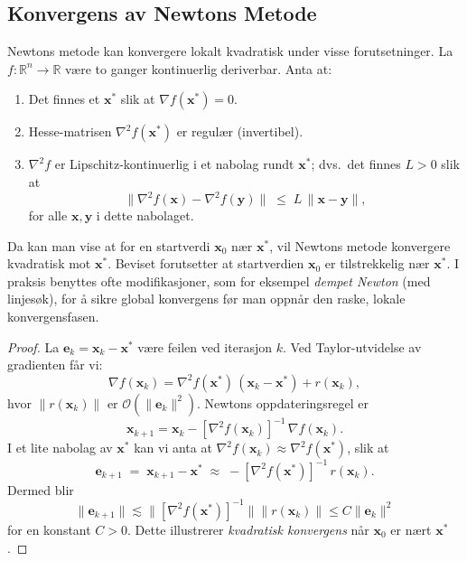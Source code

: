 \subsection{Konvergens av Newtons Metode}
Newtons metode kan konvergere lokalt kvadratisk under visse forutsetninger.
La \( f : \mathbb{R}^n \to \mathbb{R} \) være to ganger kontinuerlig deriverbar. Anta at:

\begin{enumerate}
	\item Det finnes et \(\symbf{x}^\ast\) slik at \(\nabla f(\symbf{x}^\ast) = 0\).
	\item Hesse-matrisen \(\nabla^2 f(\symbf{x}^\ast)\) er regulær (invertibel).
	\item \(\nabla^2 f\) er Lipschitz-kontinuerlig i et nabolag rundt \(\symbf{x}^\ast\); dvs.\ det finnes \( L > 0 \) slik at
	      \[
		      \| \nabla^2 f(\symbf{x}) - \nabla^2 f(\symbf{y}) \|
		      \;\le\;
		      L\,\|\symbf{x} - \symbf{y}\|,
	      \]
	      for alle \(\symbf{x}, \symbf{y}\) i dette nabolaget.
\end{enumerate}

Da kan man vise at for en startverdi \(\symbf{x}_0\) nær \(\symbf{x}^\ast\), vil Newtons metode konvergere kvadratisk mot \(\symbf{x}^\ast\).
Beviset forutsetter at startverdien \(\symbf{x}_0\) er tilstrekkelig nær \(\symbf{x}^\ast\). I praksis benyttes ofte modifikasjoner, som for eksempel \textit{dempet Newton} (med linjesøk), for å sikre global konvergens før man oppnår den raske, lokale konvergensfasen.
\begin{proof}{}{}
	La \(\symbf{e}_k = \symbf{x}_k - \symbf{x}^\ast\) være feilen ved iterasjon \(k\).
	Ved Taylor-utvidelse av gradienten får vi:
	\[
		\nabla f(\symbf{x}_k)
		= \nabla^2 f(\symbf{x}^\ast)\,(\symbf{x}_k - \symbf{x}^\ast) + r(\symbf{x}_k),
	\]
	hvor \(\|r(\symbf{x}_k)\|\) er \(\mathcal{O}(\|\symbf{e}_k\|^2)\). Newtons oppdateringsregel er
	\[
		\symbf{x}_{k+1}
		= \symbf{x}_k
		- [\nabla^2 f(\symbf{x}_k)]^{-1}\,\nabla f(\symbf{x}_k).
	\]
	I et lite nabolag av \(\symbf{x}^\ast\) kan vi anta at
	\(\nabla^2 f(\symbf{x}_k)\approx \nabla^2 f(\symbf{x}^\ast)\), slik at
	\[
		\symbf{e}_{k+1}
		\;=\; \symbf{x}_{k+1} - \symbf{x}^\ast
		\;\approx\;
		-[\nabla^2 f(\symbf{x}^\ast)]^{-1}\,r(\symbf{x}_k).
	\]
	Dermed blir
	\[
		\|\symbf{e}_{k+1}\| \lesssim \|[\nabla^2 f(\symbf{x}^\ast)]^{-1}\| \|r(\symbf{x}_k)\| \le C \|\symbf{e}_k\|^2
	\]
	for en konstant \(C>0\). Dette illustrerer \textit{kvadratisk konvergens} når \(\symbf{x}_0\) er nært \(\symbf{x}^\ast\).
\end{proof}

